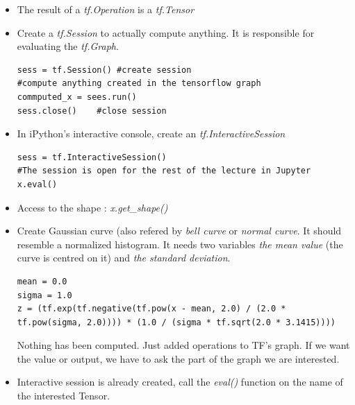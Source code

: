 \documentclass[12pt,a4paper]{article}
\begin{document}
\begin{itemize}
\begin{lstlisting}
tf.get_default_graph()
\end{lstlisting}
\begin{itemize}
\item Get the list of all added operation.
\begin{lstlisting}
[op.name for op in g.get_operations]
\end{lstlisting}
\end{itemize}
\item The result of a \textit{tf.Operation} is a \textit{tf.Tensor}
\item Create a \textit{tf.Session} to actually compute anything. It is responsible for evaluating the \textit{tf.Graph}.
\begin{lstlisting}
sess = tf.Session()	#create session
#compute anything created in the tensorflow graph
commputed_x = sees.run()
sess.close()	#close session
\end{lstlisting}
\item In iPython's interactive console, create an \textit{tf.InteractiveSession}
\begin{lstlisting}
sess = tf.InteractiveSession()
#The session is open for the rest of the lecture in Jupyter
x.eval()
\end{lstlisting}
\item Access to the shape : \textit{x.get\_shape()}
\item Create Gaussian curve (also refered by \textit{bell curve} or \textit{normal curve}. It should resemble a normalized histogram. It needs two variables \textit{the mean value} (the curve is centred on it) and \textit{the standard deviation}.
\begin{lstlisting}
mean = 0.0
sigma = 1.0
z = (tf.exp(tf.negative(tf.pow(x - mean, 2.0) / (2.0 * tf.pow(sigma, 2.0)))) * (1.0 / (sigma * tf.sqrt(2.0 * 3.1415))))
\end{lstlisting}
Nothing has been computed. Just added operations to TF's graph. If we want the value or output, we have to ask the part of the graph we are interested. 
\item Interactive session is already created, call the \textit{eval()} function on the name of the  interested Tensor.
\end{itemize}
\end{document}
